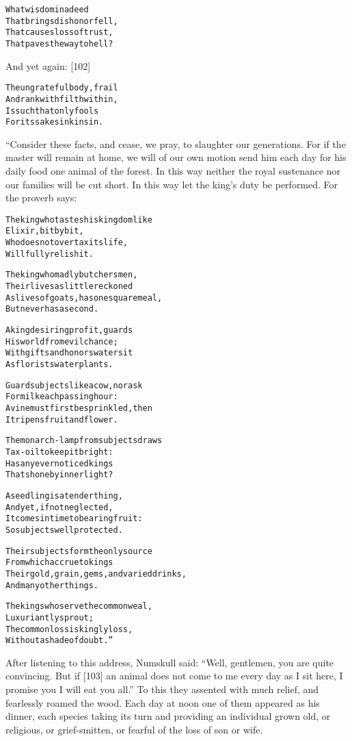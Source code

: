 \documentclass{article}
\renewenvironment{verbatim}{\begin{alltt}\normalfont\begin{centering}}{\end{centering}\end{alltt}}
\begin{document}
\begin{verbatim}
What wisdom in a deed
    That brings dishonor fell,
That causes loss of trust,
    That paves the way to hell?
\end{verbatim}
And yet again: [102]

\begin{verbatim}
The ungrateful body, frail
    And rank with filth within,
Is such that only fools
    For its sake sink in sin.
\end{verbatim}
“Consider these facts, and cease, we pray, to slaughter our
generations. For if the master will remain at home, we will of our
own motion send him each day for his daily food one animal of the
forest. In this way neither the royal sustenance nor our families
will be cut short. In this way let the king's duty be performed.
For the proverb says:

\begin{verbatim}
The king who tastes his kingdom like
    Elixir, bit by bit,
Who does not overtax its life,
Will fully relish it.

The king who madly butchers men,
    Their lives as little reckoned
As lives of goats, has one square meal,
    But never has a second.

A king desiring profit, guards
    His world from evil chance;
With gifts and honors waters it
    As florists water plants.

Guard subjects like a cow, nor ask
    For milk each passing hour:
A vine must first be sprinkled, then
    It ripens fruit and flower.

The monarch-lamp from subjects draws
    Tax-oil to keep it bright:
Has any ever noticed kings
    That shone by inner light?

A seedling is a tender thing,
    And yet, if not neglected,
It comes in time to bearing fruit:
    So subjects well protected.

Their subjects form the only source
    From which accrue to kings
Their gold, grain, gems, and varied drinks,
    And many other things.

The kings who serve the common weal,
    Luxuriantly sprout;
The common loss is kingly loss,
    Without a shade of doubt.”
\end{verbatim}
After listening to this address, Numskull said:
``Well, gentlemen, you are quite convincing. But if [103] an animal does not come to me every day as I sit here, I promise you I will eat you all.''
To this they assented with much relief, and fearlessly roamed the
wood. Each day at noon one of them appeared as his dinner, each
species taking its turn and providing an individual grown old, or
religious, or grief-smitten, or fearful of the loss of son or
wife.
\end{document}

